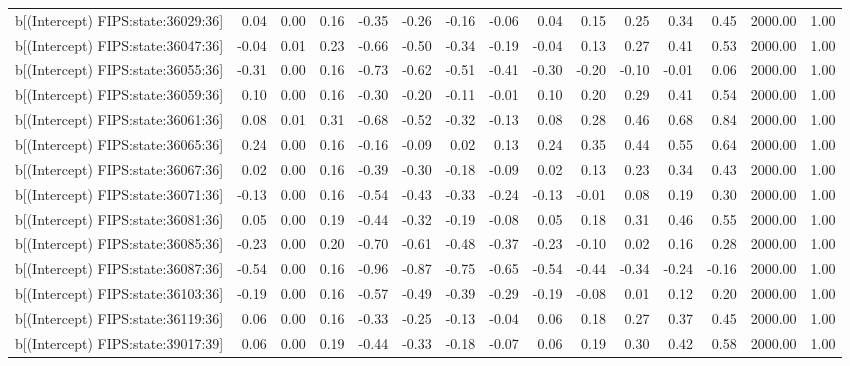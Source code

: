 \begin{table}[ht]
\begin{tabular}{rrrrrrrrrrrrrrr}
  b[(Intercept) FIPS:state:36029:36] & 0.04 & 0.00 & 0.16 & -0.35 & -0.26 & -0.16 & -0.06 & 0.04 & 0.15 & 0.25 & 0.34 & 0.45 & 2000.00 & 1.00 \\ 
  b[(Intercept) FIPS:state:36047:36] & -0.04 & 0.01 & 0.23 & -0.66 & -0.50 & -0.34 & -0.19 & -0.04 & 0.13 & 0.27 & 0.41 & 0.53 & 2000.00 & 1.00 \\ 
  b[(Intercept) FIPS:state:36055:36] & -0.31 & 0.00 & 0.16 & -0.73 & -0.62 & -0.51 & -0.41 & -0.30 & -0.20 & -0.10 & -0.01 & 0.06 & 2000.00 & 1.00 \\ 
  b[(Intercept) FIPS:state:36059:36] & 0.10 & 0.00 & 0.16 & -0.30 & -0.20 & -0.11 & -0.01 & 0.10 & 0.20 & 0.29 & 0.41 & 0.54 & 2000.00 & 1.00 \\ 
  b[(Intercept) FIPS:state:36061:36] & 0.08 & 0.01 & 0.31 & -0.68 & -0.52 & -0.32 & -0.13 & 0.08 & 0.28 & 0.46 & 0.68 & 0.84 & 2000.00 & 1.00 \\ 
  b[(Intercept) FIPS:state:36065:36] & 0.24 & 0.00 & 0.16 & -0.16 & -0.09 & 0.02 & 0.13 & 0.24 & 0.35 & 0.44 & 0.55 & 0.64 & 2000.00 & 1.00 \\ 
  b[(Intercept) FIPS:state:36067:36] & 0.02 & 0.00 & 0.16 & -0.39 & -0.30 & -0.18 & -0.09 & 0.02 & 0.13 & 0.23 & 0.34 & 0.43 & 2000.00 & 1.00 \\ 
  b[(Intercept) FIPS:state:36071:36] & -0.13 & 0.00 & 0.16 & -0.54 & -0.43 & -0.33 & -0.24 & -0.13 & -0.01 & 0.08 & 0.19 & 0.30 & 2000.00 & 1.00 \\ 
  b[(Intercept) FIPS:state:36081:36] & 0.05 & 0.00 & 0.19 & -0.44 & -0.32 & -0.19 & -0.08 & 0.05 & 0.18 & 0.31 & 0.46 & 0.55 & 2000.00 & 1.00 \\ 
  b[(Intercept) FIPS:state:36085:36] & -0.23 & 0.00 & 0.20 & -0.70 & -0.61 & -0.48 & -0.37 & -0.23 & -0.10 & 0.02 & 0.16 & 0.28 & 2000.00 & 1.00 \\ 
  b[(Intercept) FIPS:state:36087:36] & -0.54 & 0.00 & 0.16 & -0.96 & -0.87 & -0.75 & -0.65 & -0.54 & -0.44 & -0.34 & -0.24 & -0.16 & 2000.00 & 1.00 \\ 
  b[(Intercept) FIPS:state:36103:36] & -0.19 & 0.00 & 0.16 & -0.57 & -0.49 & -0.39 & -0.29 & -0.19 & -0.08 & 0.01 & 0.12 & 0.20 & 2000.00 & 1.00 \\ 
  b[(Intercept) FIPS:state:36119:36] & 0.06 & 0.00 & 0.16 & -0.33 & -0.25 & -0.13 & -0.04 & 0.06 & 0.18 & 0.27 & 0.37 & 0.45 & 2000.00 & 1.00 \\ 
  b[(Intercept) FIPS:state:39017:39] & 0.06 & 0.00 & 0.19 & -0.44 & -0.33 & -0.18 & -0.07 & 0.06 & 0.19 & 0.30 & 0.42 & 0.58 & 2000.00 & 1.00 \\ 

\end{tabular}
\end{table}

